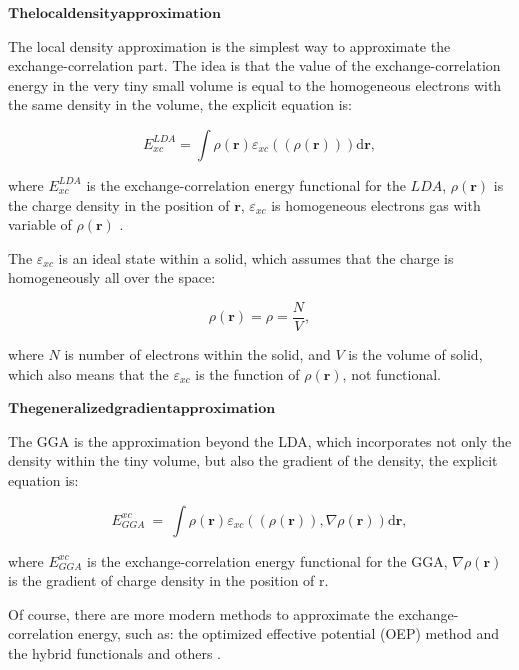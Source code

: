 \documentclass[a4paper, 12pt, titlepage,oneside,drop]{kthesis}
\begin{document}
$\mathbf{The local density approximation}$

The local density approximation is the simplest way to approximate the exchange-correlation part. The idea is that the value 
of the exchange-correlation energy in the very tiny small volume is equal to the homogeneous electrons with the same density in 
the volume, the explicit equation is: 

\begin{equation}
 E^\textit{LDA}_\textit{xc} = \int \rho(\textbf{r}) \varepsilon_\textit{xc}( (\rho(\textbf{r})) ) \mathrm{d} \textbf{r}, 
\end{equation}

where $ E^\textit{LDA}_\textit{xc} $ is the exchange-correlation energy functional for the $LDA$, $\rho(\textbf{r})$ is the charge density in the position of $\textbf{r}$, $\varepsilon_\textit{xc}$ is homogeneous 
electrons gas with variable of  $\rho(\textbf{r})$ .

The $\varepsilon_\textit{xc}$ is an ideal state within a solid, which assumes that the charge is homogeneously all over the space:

\begin{equation}
 \rho(\textbf{r}) = \rho = \frac{N}{V},
\end{equation}

where $N$ is number of electrons within the solid, and $V$ is the volume of solid, which also means that the $\varepsilon_\textit{xc}$ is the function of $\rho(\textbf{r})$,
 not functional. 

$\mathbf{The generalized gradient approximation}$

The GGA is the approximation beyond the LDA, which incorporates not only the density within the tiny volume, but also the gradient
 of the density, the explicit equation is:

\begin{equation}
E_{\textit{GGA}}^{\textit{xc}}\ = \ \int \rho(\textbf{r}) \varepsilon_\textit{xc}( (\rho(\textbf{r})), \nabla \rho(\textbf{r}) ) \mathrm{d} \textbf{r}, 
\end{equation}

where $E_{\textit{GGA}}^{\textit{xc}}$ is the exchange-correlation energy functional for the GGA, $\nabla \rho(\textbf{r})$ is the gradient  of charge density in the position of r.

Of course, there are more modern methods to approximate the exchange-correlation energy, such as: the optimized effective potential
(OEP) method and the hybrid functionals and others			.
\end{document}
